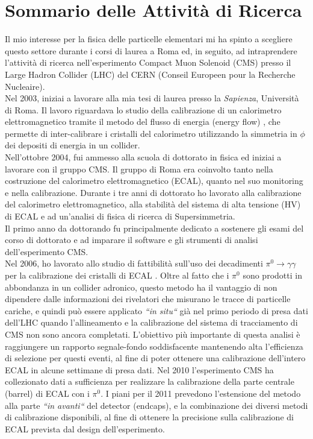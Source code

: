 \documentclass[10pt, a4paper]{article}
\begin{document}
\section*{Sommario delle Attivit\`a di Ricerca}
Il mio interesse per la fisica delle particelle elementari mi ha spinto a scegliere questo settore durante 
i corsi di laurea a Roma ed, in seguito, ad intraprendere l'attivit\`a di ricerca nell'esperimento 
Compact Muon Solenoid (CMS) presso il Large Hadron Collider (LHC) del CERN
(Conseil Europeen pour la Recherche Nucleaire). \\

Nel 2003, iniziai a lavorare alla mia tesi di laurea presso la \textit{Sapienza}, Universit\`a di Roma. Il lavoro riguardava lo studio della calibrazione di un calorimetro elettromagnetico tramite il metodo del flusso di energia (energy flow) \cite{Santanastasio:LAUREA}, che permette di inter-calibrare i cristalli del calorimetro utilizzando la simmetria in $\phi$ dei depositi di energia in un collider. \\

Nell'ottobre 2004, fui ammesso alla scuola di dottorato in fisica ed iniziai a lavorare con il gruppo CMS. 
Il gruppo di Roma era coinvolto tanto nella costruzione del calorimetro elettromagnetico (ECAL), quanto nel suo 
monitoring e nella calibrazione. Durante i tre anni di dottorato ho lavorato alla calibrazione del calorimetro elettromagnetico, 
alla stabilit\`a del sistema di alta tensione (HV) di ECAL e ad un'analisi di fisica di ricerca di Supersimmetria.  \\

Il primo anno da dottorando fu principalmente dedicato a sostenere gli esami del corso di dottorato e ad imparare 
il software e gli strumenti di analisi dell'esperimento CMS. \\

Nel 2006, ho lavorato allo studio di fattibilit\`a sull'uso dei decadimenti $\pi^0 \rightarrow \gamma\gamma$ per la 
calibrazione dei cristalli di ECAL \cite{Adzic:2008zza,DN-2007-013,IN-2006-050}. Oltre al fatto che i $\pi^0$ sono prodotti 
in abbondanza in un collider adronico, questo metodo ha il vantaggio di non dipendere dalle informazioni dei rivelatori 
che misurano le tracce di particelle cariche, e quindi pu\`o essere applicato {\it ``in situ``} gi\`a nel primo periodo di presa dati 
dell'LHC quando l'allineamento e la calibrazione del sistema di tracciamento di CMS non sono ancora completati. 
L'obiettivo pi\`u importante di questa analisi \`e raggiungere un rapporto segnale-fondo soddisfacente mantenendo alta 
l'efficienza di selezione per questi eventi, al fine di poter ottenere una calibrazione dell'intero ECAL in alcune settimane di presa dati. 
Nel 2010 l'esperimento CMS ha collezionato dati a sufficienza per realizzare la calibrazione della parte centrale (barrel) 
di ECAL con i $\pi^0$. I piani per il 2011 prevedono l'estensione del metodo alla parte {\it ``in avanti``} del detector (endcaps), 
e la combinazione dei diversi metodi di calibrazione disponibili, al fine di ottenere la precisione sulla calibrazione di ECAL 
prevista dal design dell'esperimento. \\
\end{document}
